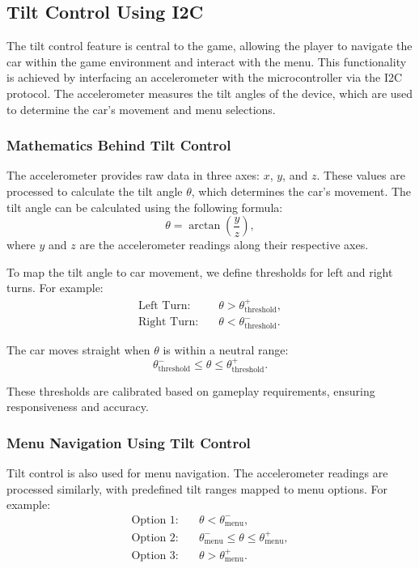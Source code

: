 \documentclass[conference]{IEEEtran}
\begin{document}
\subsection{Tilt Control Using I2C}
The tilt control feature is central to the game, allowing the player to navigate the car within the game environment and interact with the menu. This functionality is achieved by interfacing an accelerometer with the microcontroller via the I2C protocol. The accelerometer measures the tilt angles of the device, which are used to determine the car's movement and menu selections.

\subsubsection{Mathematics Behind Tilt Control}
The accelerometer provides raw data in three axes: $x$, $y$, and $z$. These values are processed to calculate the tilt angle $\theta$, which determines the car's movement. The tilt angle can be calculated using the following formula:
\begin{equation}
\theta = \arctan\left(\frac{y}{z}\right),
\end{equation}
where $y$ and $z$ are the accelerometer readings along their respective axes.

To map the tilt angle to car movement, we define thresholds for left and right turns. For example:
\begin{align}
\text{Left Turn:} & \quad \theta > \theta_{\text{threshold}}^{+}, \\
\text{Right Turn:} & \quad \theta < \theta_{\text{threshold}}^{-}.
\end{align}

The car moves straight when $\theta$ is within a neutral range:
\begin{equation}
\theta_{\text{threshold}}^{-} \leq \theta \leq \theta_{\text{threshold}}^{+}.
\end{equation}

These thresholds are calibrated based on gameplay requirements, ensuring responsiveness and accuracy.

\subsubsection{Menu Navigation Using Tilt Control}
Tilt control is also used for menu navigation. The accelerometer readings are processed similarly, with predefined tilt ranges mapped to menu options. For example:
\begin{align}
\text{Option 1:} & \quad \theta < \theta_{\text{menu}}^{-}, \\
\text{Option 2:} & \quad \theta_{\text{menu}}^{-} \leq \theta \leq \theta_{\text{menu}}^{+}, \\
\text{Option 3:} & \quad \theta > \theta_{\text{menu}}^{+}.
\end{align}
\end{document}
